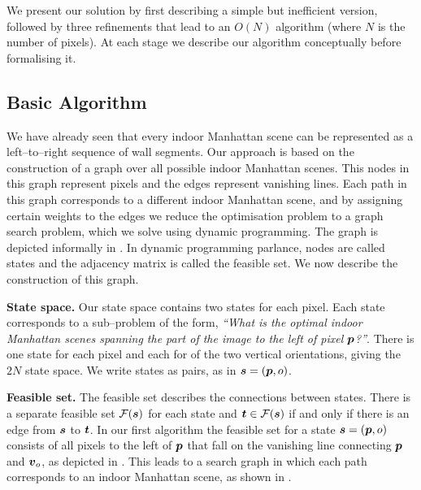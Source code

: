 We present our solution by first describing a simple but inefficient
version, followed by three refinements that lead to an $O(N)$
algorithm (where $N$ is the number of pixels). At each stage we
describe our algorithm conceptually before formalising it.

\subsection{Basic Algorithm}
\label{sec:basic-alg}

We have already seen that every indoor Manhattan scene can be
represented as a left--to--right sequence of wall segments. Our
approach is based on the construction of a graph over all possible
indoor Manhattan scenes. This nodes in this graph represent pixels and
the edges represent vanishing lines. Each path in this graph
corresponds to a different indoor Manhattan scene, and by assigning
certain weights to the edges we reduce the optimisation problem
 to a graph search problem, which we solve using
dynamic programming. The graph is depicted informally in
. In dynamic programming parlance, nodes are
called states and the adjacency matrix is called the feasible set. We
now describe the construction of this graph.

\textbf{State space.} Our state space contains two states for each
pixel. Each state corresponds to a sub--problem of the form,
\textit{``What is the optimal indoor Manhattan scenes spanning the
  part of the image to the left of pixel $\Pixel$?''}. There is
one state for each pixel and each for of the two vertical
orientations, giving the $2N$ state space. We write states as pairs,
as in $\State=(\Pixel,\WallOrient)$.

\textbf{Feasible set.} The feasible set describes the connections
between states. There is a separate feasible set
$\FeasibleSet(\State)$ for each state and
$\OtherState\in\FeasibleSet(\State)$ if and only if there is an edge
from $\State$ to $\OtherState$. In our first algorithm the feasible
set for a state $\State=(\Pixel,\WallOrient)$ consists of all pixels
to the left of $\Pixel$ that fall on the vanishing line connecting
$\Pixel$ and $\vpt_{\WallOrient}$, as depicted in
. This leads to a search graph in which each
path corresponds to an indoor Manhattan scene, as shown in
.

